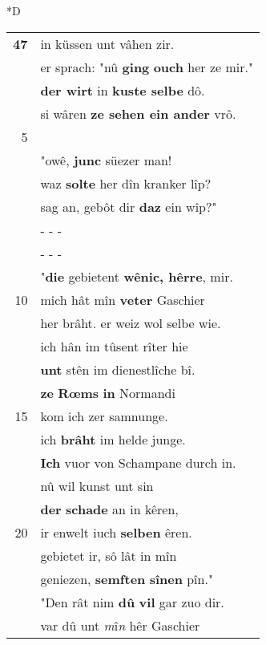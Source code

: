\documentclass[8pt,a4paper,notitlepage]{article}
\begin{document}
\begin{table}[ht]
\begin{minipage}[t]{0.5\linewidth}
\small
\begin{center}*D
\end{center}
\begin{tabular}{rl}
\textbf{47} & in küssen unt vâhen zir.\\ 
 & er sprach: "nû \textbf{ging} \textbf{ouch} her ze mir."\\ 
 & \textbf{der wirt} in \textbf{kuste selbe} dô.\\ 
 & si wâren \textbf{ze sehen ein ander} vrô.\\ 
5 & \textit{\begin{large}G\end{large}}ahmuret sprach aber sân:\\ 
 & "owê, \textbf{junc} süezer man!\\ 
 & waz \textbf{solte} her dîn kranker lîp?\\ 
 & sag an, gebôt dir \textbf{daz} ein wîp?"\\ 
 & \multicolumn{1}{l}{ - - - }\\ 
 & \multicolumn{1}{l}{ - - - }\\ 
 & "\textbf{die} gebietent \textbf{wênic, hêrre}, mir.\\ 
10 & mich hât mîn \textbf{veter} Gaschier\\ 
 & her brâht. er weiz wol selbe wie.\\ 
 & ich hân im tûsent rîter hie\\ 
 & \textbf{unt} stên im dienestlîche bî.\\ 
 & \textbf{ze} \textbf{Rœms} \textbf{in} Normandi\\ 
15 & kom ich zer samnunge.\\ 
 & ich \textbf{brâht} im helde junge.\\ 
 & \textbf{Ich} vuor von Schampane durch in.\\ 
 & nû wil kunst unt sin\\ 
 & \textbf{der} \textbf{schade} an in kêren,\\ 
20 & ir enwelt iuch \textbf{selben} êren.\\ 
 & gebietet ir, sô lât in mîn\\ 
 & geniezen, \textbf{semften} \textbf{sînen} pîn."\\ 
 & "Den rât nim \textbf{dû} \textbf{vil} gar zuo dir.\\ 
 & var dû unt \textit{m}î\textit{n} hêr Gaschier\\ 

\end{tabular}
\end{minipage}
\end{table}
\end{document}
